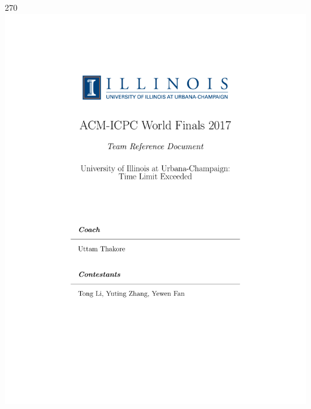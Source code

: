 \documentclass[10pt,landscape]{article}
\begin{document}
\begin{turn}{270}
    \includegraphics[scale=0.7]{frontpage.pdf}
\end{turn}
\thispagestyle{empty}
\newpage
\end{document}
